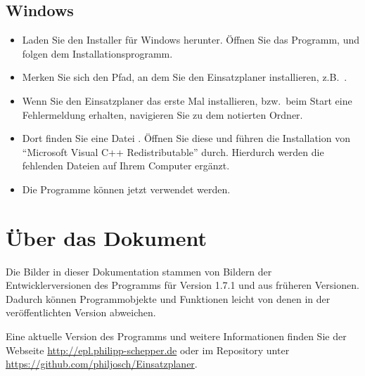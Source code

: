 \subsection{Windows}
\begin{itemize}
  \item Laden Sie den Installer für Windows herunter.
  Öffnen Sie das Programm, und folgen dem Installationsprogramm.
  \item Merken Sie sich den Pfad, an dem Sie den Einsatzplaner installieren, z.B.\ .
  \item Wenn Sie den Einsatzplaner das erste Mal installieren,
  bzw.\ beim Start eine Fehlermeldung erhalten,
  navigieren Sie zu dem notierten Ordner.
  \item Dort finden Sie eine Datei .
  Öffnen Sie diese und führen die Installation von \enquote{Microsoft Visual C++ Redistributable} durch.
  Hierdurch werden die fehlenden Dateien auf Ihrem Computer ergänzt.
  \item Die Programme können jetzt verwendet werden.
\end{itemize}



\section{Über das Dokument}\label{epl:allg:sonstiges}
Die Bilder in dieser Dokumentation stammen von Bildern der Entwicklerversionen des Programms für Version
1.7.1
und aus früheren Versionen.
Dadurch können Programmobjekte und Funktionen leicht von denen in der veröffentlichten Version abweichen.

Eine aktuelle Version des Programms und weitere Informationen finden Sie der Webseite \url{http://epl.philipp-schepper.de}
oder im Repository unter \url{https://github.com/philjosch/Einsatzplaner}.
